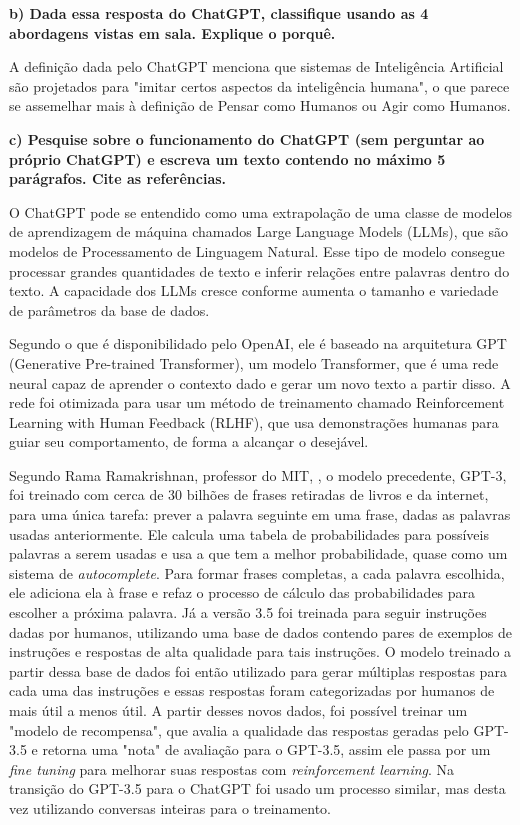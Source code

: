 \begin{adjustwidth}{1em}{}
\textbf{b) Dada essa resposta do ChatGPT, classifique usando as 4 abordagens vistas em
sala. Explique o porquê.}
\end{adjustwidth}

A definição dada pelo ChatGPT menciona que sistemas de Inteligência Artificial são projetados para "imitar certos aspectos da inteligência humana", o que parece se assemelhar mais à definição de Pensar como Humanos ou Agir como Humanos.

\begin{adjustwidth}{1em}{}
\textbf{c) Pesquise sobre o funcionamento do ChatGPT (sem perguntar ao próprio
ChatGPT) e escreva um texto contendo no máximo 5 parágrafos. Cite as referências.}
\end{adjustwidth}

O ChatGPT pode se entendido como uma extrapolação de uma classe de modelos de aprendizagem de máquina chamados Large Language Models (LLMs), que são modelos de Processamento de Linguagem Natural. Esse tipo de modelo consegue processar grandes quantidades de texto e inferir relações entre palavras dentro do texto. A capacidade dos LLMs cresce conforme aumenta o tamanho e variedade de parâmetros da base de dados.\cite{towardsdatascience}

Segundo o que é disponibilidado pelo OpenAI\cite{OpenAI}, ele é baseado na arquitetura GPT (Generative Pre-trained Transformer), um modelo Transformer, que é uma rede neural capaz de aprender o contexto dado e gerar um novo texto a partir disso. A rede foi otimizada para usar um método de treinamento chamado Reinforcement Learning with Human Feedback (RLHF), que usa demonstrações humanas para guiar seu comportamento, de forma a alcançar o desejável.

Segundo Rama Ramakrishnan, professor do MIT, \cite{MIT}, o modelo precedente, GPT-3, foi treinado com cerca de 30 bilhões de frases retiradas de livros e da internet, para uma única tarefa: prever a palavra seguinte em uma frase, dadas as palavras usadas anteriormente. Ele calcula uma tabela de probabilidades para possíveis palavras a serem usadas e usa a que tem a melhor probabilidade, quase como um sistema de \textit{autocomplete}. Para formar frases completas, a cada palavra escolhida, ele adiciona ela à frase e refaz o processo de cálculo das probabilidades para escolher a próxima palavra. Já a versão 3.5 foi treinada para seguir instruções dadas por humanos, utilizando uma base de dados contendo pares de exemplos de instruções e respostas de alta qualidade para tais instruções. O modelo treinado a partir dessa base de dados foi então utilizado para gerar múltiplas respostas para cada uma das instruções e essas respostas foram categorizadas por humanos de mais útil a menos útil. A partir desses novos dados, foi possível treinar um "modelo de recompensa", que avalia a qualidade das respostas geradas pelo GPT-3.5 e retorna uma "nota" de avaliação para o GPT-3.5, assim ele passa por um \textit{fine tuning} para melhorar suas respostas com \textit{reinforcement learning}. Na transição do GPT-3.5 para o ChatGPT foi usado um processo similar, mas desta vez utilizando conversas inteiras para o treinamento.

